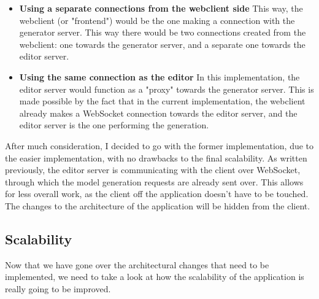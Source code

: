 \begin{itemize}
        \item \textbf{Using a separate connections from the webclient side}
		This way, the webclient (or "frontend") would be the one making a connection with the generator server. This way
		there would be two connections created from the webclient: one towards the generator server, and a separate one 
		towards the editor server.

		\item \textbf{Using the same connection as the editor}
		In this implementation, the editor server would function as a "proxy" towards the generator server. This is made possible 
		by the fact that in the current implementation, the webclient already makes a WebSocket connection towards the editor server, and 
		the editor server is the one performing the generation.
\end{itemize}

After much consideration, I decided to go with the former implementation, due to the easier implementation, with no drawbacks
to the final scalability. As written previously, the editor server is communicating with the client over WebSocket, through which
the model generation requests are already sent over. This allows for less overall work, as the client off the application
doesn't have to be touched. The changes to the architecture of the application will be hidden from the client.

\subsection{Scalability}

Now that we have gone over the architectural changes that need to be implemented, we need to take a look at how the 
scalability of the application is really going to be improved.